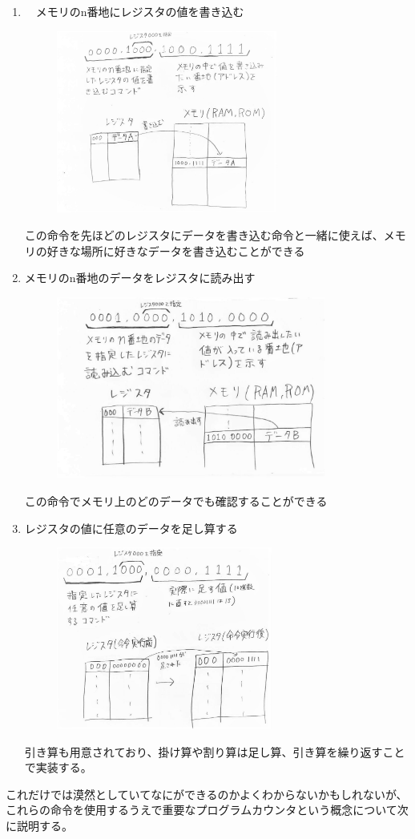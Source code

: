 \begin{enumerate}
  \item　メモリのn番地にレジスタの値を書き込む
  \begin{figure}[H]
    \centering
    \includegraphics[height=6cm]{honda/image/12.jpg}
  \end{figure}
  この命令を先ほどのレジスタにデータを書き込む命令と一緒に使えば、メモリの好きな場所に好きなデータを書き込むことができる
  \item	メモリのn番地のデータをレジスタに読み出す
  \begin{figure}[H]
    \centering
    \includegraphics[height=6cm]{honda/image/13.jpg}
  \end{figure}
  この命令でメモリ上のどのデータでも確認することができる
  \item レジスタの値に任意のデータを足し算する
  \begin{figure}[H]
    \centering
    \includegraphics[height=6cm]{honda/image/11.jpg}
  \end{figure}
  引き算も用意されており、掛け算や割り算は足し算、引き算を繰り返すことで実装する。
\end{enumerate}
これだけでは漠然としていてなにができるのかよくわからないかもしれないが、これらの命令を使用するうえで重要なプログラムカウンタという概念について次に説明する。

